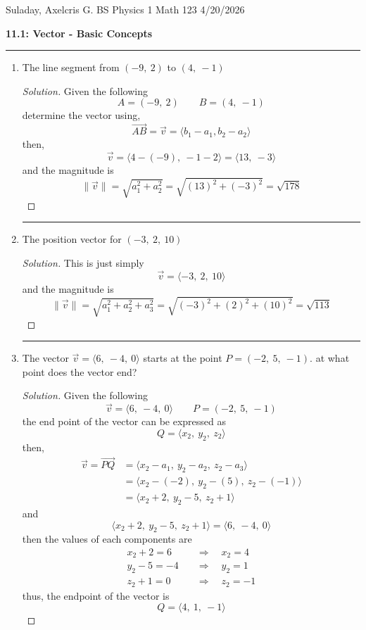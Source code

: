 \documentclass[12pt]{article}
\begin{document}
	\begin{center}
		Suladay, Axelcris G.  \hfill BS Physics 1 \hspace*{0.25in} Math 123 \hspace*{0.25in} 4/20/2026
	\end{center}
	
	\noindent
	{\Large \textbf{11.1: Vector - Basic Concepts}} \\
	\hrule
	
	\begin{enumerate}
		\item[1.)] The line segment from \(\left(-9,~2\right)\) to \(\left(4,~-1\right)\)
			\begin{proof}[Solution]
				Given the following
				\[A = \left(-9,~2\right)\qquad B = \left(4,~-1\right)\]
				determine the vector using,
				\[\overrightarrow{AB} = \vec{v} = \langle b_1-a_1,b_2-a_2\rangle\]
				then,
				\[\vec{v} = \langle 4-\left(-9\right),~-1-2 \rangle = \langle 13,~-3\rangle\]
				and the magnitude is
				\[\|\vec{v}\| = \sqrt{a_1^2+a_2^2} = \sqrt{\left(13\right)^2+\left(-3\right)^2} = \sqrt{178}\]
			\end{proof}
			\hrule
		
		\item[3.)] The position vector for \(\left(-3,~2,~10\right)\)
			\begin{proof}[Solution]
				This is just simply
				\[\vec{v} = \langle -3,~2,~10\rangle\]
				and the magnitude is
				\[\|\vec{v}\| = \sqrt{a_1^2+a_2^2+a_3^2} = \sqrt{\left(-3\right)^2+\left(2\right)^2+\left(10\right)^2} = \sqrt{113}\]
			\end{proof}
			\hrule
			
		\item[5.)] The vector \(\vec{v} = \langle 6,~-4,~0\rangle\) starts at the point \(P = \left(-2,~5,~-1\right)\). at what point does the vector end?
			\begin{proof}[Solution]
				Given the following
				\[\vec{v} = \langle 6,~-4,~0\rangle \qquad P = \left(-2,~5,~-1\right)\]
				the end point of the vector can be expressed as
				\[Q = \langle x_2,~y_2,~z_2\rangle\]
				then,
				\begin{align*}
					\vec{v} = \overrightarrow{PQ} & = \langle x_2-a_1,~y_2-a_2,~z_2-a_3\rangle \\
					& = \langle x_2-\left(-2\right),~y_2-\left(5\right),~z_2-\left(-1\right)\rangle \\
					& = \langle x_2+2,~y_2-5,~z_2+1\rangle
				\end{align*}
				and
				\[\langle x_2+2,~y_2-5,~z_2+1\rangle = \langle 6,~-4,~0\rangle\]
				then the values of each components are
				\begin{align*}
					x_2+2=6\quad & \Longrightarrow \quad x_2=4 \\
					y_2-5=-4 \quad & \Longrightarrow \quad y_2=1 \\
					z_2+1 = 0 \quad & \Longrightarrow \quad z_2=-1
				\end{align*}
				thus, the endpoint of the vector is 
				\[Q = \langle 4,~1,~-1\rangle\]
			\end{proof}
	\end{enumerate}
	
\end{document}
